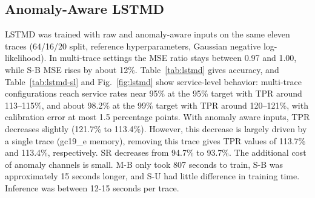 \documentclass[conference]{IEEEtran}
\begin{document}
\subsection{Anomaly-Aware LSTMD}\label{anomaly-aware-lstmd}

LSTMD was trained with raw and anomaly-aware inputs on the same eleven traces
(64/16/20 split, reference hyperparameters, Gaussian negative log-likelihood).
In multi-trace settings the MSE ratio stays between 0.97 and 1.00, while S-B MSE
rises by about 12\%. Table~\ref{tab:lstmd} gives accuracy, and Table~\ref{tab:lstmd-sl} and
Fig.~\ref{fig:lstmd} show service-level behavior: multi-trace configurations reach service rates near
95\% at the 95\% target with TPR around 113--115\%, and about 98.2\% at the 99\%
target with TPR around 120--121\%, with calibration error at most 1.5
percentage points. With anomaly aware inputs, TPR decreases slightly (121.7\% to 113.4\%). However, this decrease is largely driven by a single trace (gc19_e memory), removing this trace gives TPR values of 113.7\% and 113.4\%, respectively. SR decreases from 94.7\% to 93.7\%. The additional cost of anomaly channels is small. M-B only took 807 seconds to train, S-B was approximately 15 seconds longer, and S-U had little difference in training time. Inference was between 12-15 seconds per trace.

\begin{table}[!t]
\caption{LSTMD with and without anomaly-aware inputs, mean over eleven traces
(one run per trace). R: raw; A: anomaly-aware; S: spike; SUP: spike
underprediction (\%), the share of spike points where the mean forecast is
below actual demand.}
\label{tab:lstmd}
\centering
\scriptsize
\setlength{\tabcolsep}{2.5pt}
\end{table}
\end{document}
